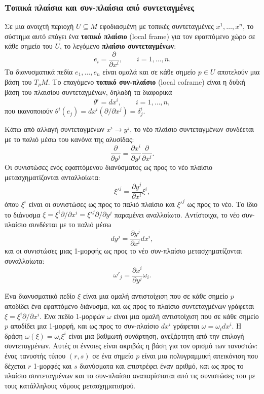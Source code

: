 \documentclass[12pt]{article}
\begin{document}
\subsubsection{Τοπικά πλαίσια και συν-πλαίσια από συντεταγμένες}

Σε μια ανοιχτή περιοχή $U \subseteq M$ εφοδιασμένη με τοπικές συντεταγμένες $x^1, \dots, x^n$, το σύστημα αυτό επάγει ένα \textbf{τοπικό πλαίσιο} (local frame) για τον εφαπτόμενο χώρο σε κάθε σημείο του $U$, το λεγόμενο \textbf{πλαίσιο συντεταγμένων}:
\[
e_i = \frac{\partial}{\partial x^i}, \qquad i = 1, \dots, n.
\]
Τα διανυσματικά πεδία $e_1, \dots, e_n$ είναι ομαλά και σε κάθε σημείο $p \in U$ αποτελούν μια βάση του $T_pM$. Το επαγόμενο \textbf{τοπικό συν-πλαίσιο} (local coframe) είναι η δυϊκή βάση του πλαισίου συντεταγμένων, δηλαδή τα διαφορικά
\[
\theta^i = dx^i, \qquad i = 1, \dots, n,
\]
που ικανοποιούν $\theta^i(e_j) = dx^i(\partial / \partial x^j) = \delta^i_j$.

Κάτω από αλλαγή συντεταγμένων $x^i \to y^j$, το νέο πλαίσιο συντεταγμένων συνδέεται με το παλιό μέσω του κανόνα της αλυσίδας:
\[
\frac{\partial}{\partial y^j} = \frac{\partial x^i}{\partial y^j} \frac{\partial}{\partial x^i}. \tag{0.7}
\]
Οι συνιστώσες ενός εφαπτόμενου διανύσματος ως προς το νέο πλαίσιο μετασχηματίζονται ανταλλοίωτα:
\[
\xi'^j = \frac{\partial y^j}{\partial x^i} \xi^i, \tag{0.8}
\]
όπου $\xi^i$ είναι οι συνιστώσες ως προς το παλιό πλαίσιο και $\xi'^j$ ως προς το νέο. Το ίδιο το διάνυσμα $\xi = \xi^i \partial / \partial x^i = \xi'^j \partial / \partial y^j$ παραμένει αναλλοίωτο. Αντίστοιχα, το νέο συν-πλαίσιο συνδέεται με το παλιό μέσω
\[
dy^j = \frac{\partial y^j}{\partial x^i} dx^i, \tag{0.9}
\]
και οι συνιστώσες μιας 1-μορφής ως προς το νέο συν-πλαίσιο μετασχηματίζονται συναλλοίωτα:
\[
\omega'_j = \frac{\partial x^i}{\partial y^j} \omega_i. \tag{0.10}
\]

Ένα διανυσματικό πεδίο $\xi$ είναι μια ομαλή αντιστοίχιση που σε κάθε σημείο $p$ αποδίδει ένα εφαπτόμενο διάνυσμα, και ως προς το πλαίσιο συντεταγμένων γράφεται $\xi = \xi^i \partial / \partial x^i$. Ένα πεδίο 1-μορφών $\omega$ είναι μια ομαλή αντιστοίχιση που σε κάθε σημείο $p$ αποδίδει μια 1-μορφή, και ως προς το συν-πλαίσιο $dx^i$ γράφεται $\omega = \omega_i dx^i$. Η δράση $\omega(\xi) = \omega_i \xi^i$ είναι μια βαθμωτή συνάρτηση, ανεξάρτητη από την επιλογή συντεταγμένων. Αυτές οι έννοιες είναι ακριβώς η βάση για τον ορισμό των τανυστών: ένας τανυστής τύπου $(r, s)$ σε ένα σημείο $p$ είναι μια πολυγραμμική απεικόνιση που δέχεται $r$ 1-μορφές και $s$ διανύσματα και επιστρέφει έναν αριθμό, και ως προς το πλαίσιο συντεταγμένων και το συν-πλαίσιο αναπαρίσταται από τις συνιστώσες του με τους κατάλληλους νόμους μετασχηματισμού.
\end{document}
